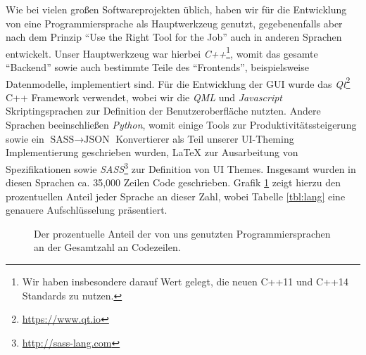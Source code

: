 Wie bei vielen großen Softwareprojekten üblich, haben wir für die Entwicklung
von \erasim{} eine Programmiersprache als Hauptwerkzeug genutzt, gegebenenfalls
aber nach dem Prinzip ``Use the Right Tool for the Job'' auch in anderen
Sprachen entwickelt. Unser Hauptwerkzeug war hierbei \emph{C++}\footnote{Wir
haben insbesondere darauf Wert gelegt, die neuen C++11 und C++14 Standards zu
nutzen.}, womit das gesamte ``Backend'' sowie auch bestimmte Teile des
``Frontends'', beispielsweise Datenmodelle, implementiert sind. Für die
Entwicklung der GUI wurde das \emph{Qt}\footnote{\url{https://www.qt.io}} C++
Framework verwendet, wobei wir die \emph{QML} und \emph{Javascript}
Skriptingsprachen zur Definition der Benutzeroberfläche nutzten. Andere Sprachen
beeinschließen \emph{Python}, womit einige Tools zur Produktivitätssteigerung
sowie ein $\text{SASS} \rightarrow \text{JSON}$ Konvertierer als Teil unserer
UI-Theming Implementierung geschrieben wurden, \LaTeX{} zur Ausarbeitung von
Spezifikationen sowie \emph{SASS}\footnote{\url{http://sass-lang.com}} zur
Definition von UI Themes. Insgesamt wurden in diesen Sprachen ca. 35,000 Zeilen
Code geschrieben. Grafik \ref{fig:lang} zeigt hierzu den prozentuellen Anteil
jeder Sprache an dieser Zahl, wobei Tabelle \ref{tbl:lang} eine genauere
Aufschlüsselung präsentiert.

\begin{figure}[h!]
  \centering
  \vspace{-0.2cm}
  \caption{Der prozentuelle Anteil der von uns genutzten Programmiersprachen  an der Gesamtzahl an Codezeilen.}
  \label{fig:lang}
\end{figure}

